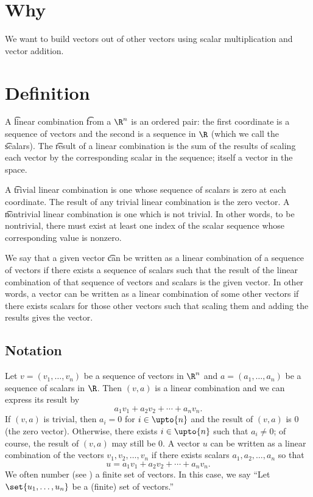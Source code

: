 
\section*{Why}

We want to build vectors out of other vectors using scalar multiplication and vector addition.

\section*{Definition}

A \t{linear combination} \t{from} a $\R ^n$ is an ordered pair: the first coordinate is a sequence of vectors and the second is a sequence in $\R $ (which we call the \t{scalars}).
The \t{result} of a linear combination is the sum of the results of scaling each vector by the corresponding scalar in the sequence; itself a vector in the space.

A \t{trivial linear combination} is one whose sequence of scalars is zero at each coordinate.
The result of any trivial linear combination is the zero vector.
A \t{nontrivial linear combination} is one which is not trivial.
In other words, to be nontrivial, there must exist at least one index of the scalar sequence whose corresponding value is nonzero.

We say that a given vector \t{can be written as a linear combination of} a sequence of vectors if there exists a sequence of scalars such that the result of the linear combination of that sequence of vectors and scalars is the given vector.
In other words, a vector can be written as a linear combination of some other vectors if there exists scalars for those other vectors such that scaling them and adding the results gives the vector.

\subsection*{Notation}

Let $v = (v_1, \dots , v_n)$ be a sequence of vectors in $\R ^n$ and
$a = (a_1, \dots , a_n)$ be a sequence of scalars in $\R $.
Then $(v, a)$ is a linear combination and we can express its result by
\[
a_1v_1 + a_2v_2 + \cdots + a_n v_n.
\]
If $(v,a)$ is trivial, then $a_i = 0$ for $i \in \upto{n}$ and the result of $(v, a)$ is $0$ (the zero vector).
Otherwise, there exists $i \in \upto{n}$ such that $a_i \neq 0$; of course, the result of $(v, a)$ may still be $0$.
A vector $u$ can be written as a linear combination of the vectors $v_1, v_2, \dots , v_n$ if there exists scalars $a_1, a_2, \dots , a_n$ so that
\[
u = a_1v_1 + a_2v_2 + \cdots + a_nv_n.
\]
We often number (see ) a finite set of vectors.
In this case, we say ``Let $\set{u_1, \dots , u_n}$ be a (finite) set of vectors.''

